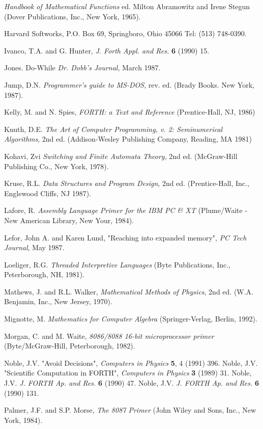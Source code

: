 \textit{Handbook of Mathematical Functions} ed. Milton Abramowitz and Irene Stegun (Dover Publications, Inc., New York, 1965).

Harvard Softworks, P.O. Box 69, Springboro, Ohio 45066 Tel: (513) 748-0390.

Ivanco, T.A. and G. Hunter, \textit{J. Forth Appl. and Res.} \textbf{6} (1990) 15.

Jones. Do-While \textit{Dr. Dobb's Journal}, March 1987.

Jump, D.N. \textit{Programmer's guide to MS-DOS}, rev. ed. (Brady Books. New York, 1987).

Kelly, M. and N. Spies, \textit{FORTH: a Text and Reference} (Prentice-Hall, NJ, 1986)

Knuth, D.E. \textit{The Art of Computer Programming, v. 2: Seminumerical Algorithms}, 2nd ed. (Addison-Wesley Publishing Company, Reading, MA 1981)

Kohavi, Zvi \textit{Switching and Finite Automata Theory}, 2nd ed. (McGraw-Hill Publishing Co., New York, 1978).

Kruse, R.L. \textit{Data Structures and Program Design}, 2nd ed. (Prentice-Hall, Inc., Englewood Cliffs, NJ 1987).

Lafore, R. \textit{Assembly Language Primer for the IBM PC \& XT} (Plume/Waite -New American Library, New Your, 1984).

Lefor, John A. and Karen Lund, "Reaching into expanded memory", \textit{PC Tech Journal}, May 1987.

Loeliger, R.G. \textit{Threaded Interpretive Languages} (Byte Publications, Inc., Peterborough, NH, 1981).

Mathews, J. and R.L. Walker, \textit{Mathematical Methods of Physics}, 2nd ed. (W.A. Benjamin, Inc., New Jersey, 1970).

Mignotte, M. \textit{Mathematics for Computer Algebra} (Springer-Verlag, Berlin, 1992).

Morgan, C. and M. Waite, \textit{8086/8088 16-bit microprocessor primer} (Byte/McGraw-Hill, Peterborough, 1982).

Noble, J.V. "Avoid Decisions", \textit{Computers in Physics} \textbf{5}, 4 (1991) 396.
Noble, J.V. "Scientific Computation in FORTH", \textit{Computers in Physics} \textbf{3} (1989) 31.
Noble, J.V. \textit{J. FORTH Ap. and Res.} \textbf{6} (1990) 47.
Noble, J.V. \textit{J. FORTH Ap. and Res.} \textbf{6} (1990) 131.

Palmer, J.F. and S.P. Morse, \textit{The 8087 Primer} (John Wiley and Sons, Inc., New York, 1984).

